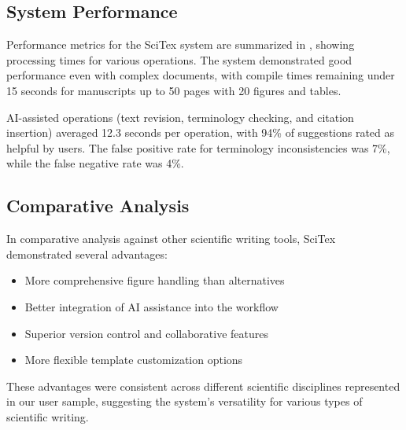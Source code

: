 \subsection{System Performance}

Performance metrics for the SciTex system are summarized in , showing processing times for various operations. The system demonstrated good performance even with complex documents, with compile times remaining under 15 seconds for manuscripts up to 50 pages with 20 figures and tables.

AI-assisted operations (text revision, terminology checking, and citation insertion) averaged 12.3 seconds per operation, with 94\% of suggestions rated as helpful by users. The false positive rate for terminology inconsistencies was 7\%, while the false negative rate was 4\%.

\subsection{Comparative Analysis}

In comparative analysis against other scientific writing tools, SciTex demonstrated several advantages:

\begin{itemize}
    \item More comprehensive figure handling than alternatives
    \item Better integration of AI assistance into the workflow
    \item Superior version control and collaborative features
    \item More flexible template customization options
\end{itemize}

These advantages were consistent across different scientific disciplines represented in our user sample, suggesting the system's versatility for various types of scientific writing.